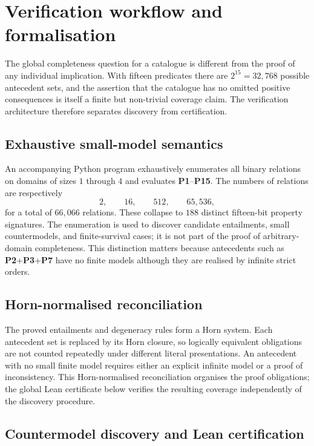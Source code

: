 \documentclass[11pt,a4paper,reqno]{amsart}
\theoremstyle{definition}
\theoremstyle{remark}
\newcommand{\prop}[1]{\textbf{P#1}}
\begin{document}
\section{Verification workflow and formalisation}\label{sec:verification}

The global completeness question for a catalogue is different from the proof of
any individual implication.  With fifteen predicates there are
$2^{15}=32{,}768$ possible antecedent sets, and the assertion that the
catalogue has no omitted positive consequences is itself a finite but
non-trivial coverage claim.  The verification architecture therefore separates discovery
from certification.

\subsection{Exhaustive small-model semantics}

An accompanying Python program exhaustively enumerates all binary relations on
domains of sizes $1$ through $4$ and evaluates \prop{1}--\prop{15}.  The numbers
of relations are respectively
\[
2,\qquad 16,\qquad 512,\qquad 65{,}536,
\]
for a total of $66{,}066$ relations.  These collapse to $188$ distinct
fifteen-bit property signatures.  The enumeration is used to discover
candidate entailments, small countermodels, and finite-survival cases; it is
not part of the proof of arbitrary-domain completeness.  This distinction
matters because antecedents such as \prop{2}+\prop{3}+\prop{7} have no finite
models although they are realised by infinite strict orders.

\subsection{Horn-normalised reconciliation}

The proved entailments and degeneracy rules form a Horn system.  Each
antecedent set is replaced by its Horn closure, so logically equivalent
obligations are not counted repeatedly under different literal presentations.
An antecedent with no small finite model requires either an explicit infinite
model or a proof of inconsistency.  This Horn-normalised reconciliation
organises the proof obligations; the global Lean certificate below verifies
the resulting coverage independently of the discovery procedure.

\subsection{Countermodel discovery and Lean certification}
\end{document}
